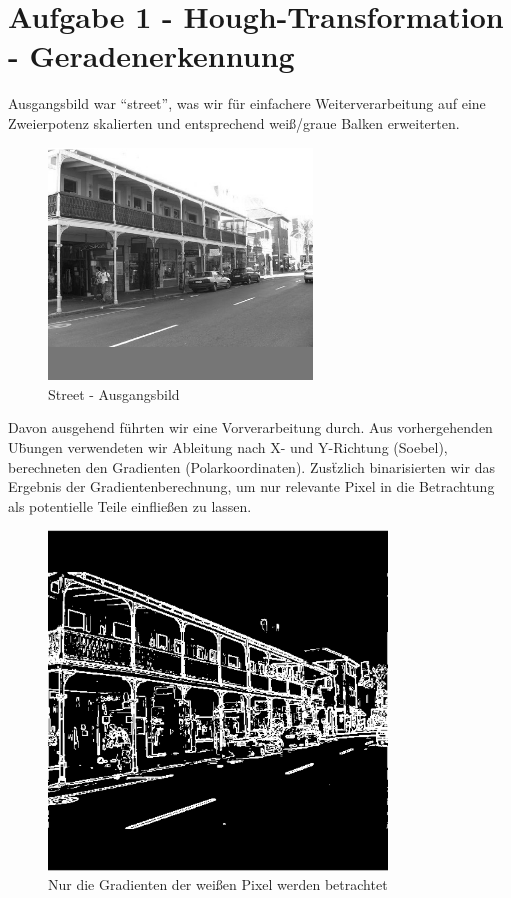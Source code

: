 



\newcommand{\nr}{10}
\lstset{language=matlab}


\section*{Aufgabe 1 - Hough-Transformation - Geradenerkennung}

Ausgangsbild war ``street'', was wir f\"ur einfachere Weiterverarbeitung
auf eine Zweierpotenz skalierten und entsprechend wei\ss{}/graue Balken
erweiterten.
\begin{figure}[H]
\begin{center}
\includegraphics[width=70mm]{u10/street.eps}
\end{center}
\label{street}
\caption{Street - Ausgangsbild}
\end{figure}

Davon ausgehend f\"uhrten wir eine Vorverarbeitung durch. Aus vorhergehenden
U\"bungen verwendeten wir Ableitung nach X- und Y-Richtung (Soebel), berechneten 
den Gradienten (Polarkoordinaten). Zus\"tzlich binarisierten wir das Ergebnis der Gradientenberechnung,
um nur relevante Pixel in die Betrachtung als potentielle Teile einflie\ss{}en zu lassen.

\begin{figure}[H]
\begin{center}
\includegraphics[width=90mm]{u10/street_edges.eps}
\end{center}
\label{streete}
\caption{Nur die Gradienten der wei\ss en Pixel werden betrachtet}
\end{figure}

